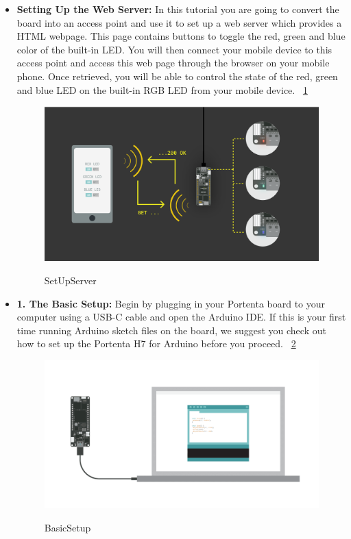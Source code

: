\begin{itemize}
	\item \textbf{Setting Up the Web Server:} In this tutorial you are going to convert the board into an access point and use it to set up a web server which provides a HTML webpage. This page contains buttons to toggle the red, green and blue color of the built-in LED. You will then connect your mobile device to this access point and access this web page through the browser on your mobile phone. Once retrieved, you will be able to control the state of the red, green and blue LED on the built-in RGB LED from your mobile device. ~\ref{SetUpServer} \cite{portentaWifiAccessPoint:2024}
	
	\begin{figure}
		\begin{center}
			\includegraphics[width=0.7\linewidth]{Images/WIFI Module/SetUpServer.png}
			\caption{SetUpServer}
			\label{SetUpServer} \cite{portentaWifiAccessPoint:2024}
		\end{center}
	\end{figure}
	
	\item \textbf{1. The Basic Setup:} Begin by plugging in your Portenta board to your computer using a USB-C cable and open the Arduino IDE. If this is your first time running Arduino sketch files on the board, we suggest you check out how to set up the Portenta H7 for Arduino before you proceed. ~\ref{The Portenta H7 can be connected to the computer using an appropriate USB-C cable} \cite{portentaWifiAccessPoint:2024}
	
	\begin{figure}
		\begin{center}
			\includegraphics[width=0.7\linewidth]{Images/WIFI Module/BasicSetup.png}
			\caption{BasicSetup}
			\label{The Portenta H7 can be connected to the computer using an appropriate USB-C cable} \cite{portentaWifiAccessPoint:2024}
		\end{center}
	\end{figure}
	

\end{itemize}
